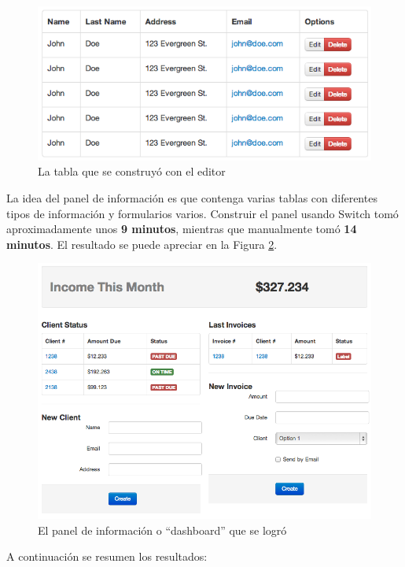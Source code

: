 \documentclass[12pt,titlepage,]{article}
\makeatletter
\def\maxwidth{\ifdim\Gin@nat@width>\linewidth\linewidth
\else\Gin@nat@width\fi}
\let\Oldincludegraphics\includegraphics
\renewcommand{\includegraphics}[1]{\Oldincludegraphics[width=\maxwidth]{#1}}
\makeatother
\begin{document}
\begin{figure}[htbp]
\centering
\includegraphics{figures/table-switch.png}
\caption{La tabla que se construyó con el editor
\label{figures:table-switch}}
\end{figure}

La idea del panel de información es que contenga varias tablas con
diferentes tipos de información y formularios varios. Construir el panel
usando Switch tomó aproximadamente unos \textbf{9 minutos}, mientras que
manualmente tomó \textbf{14 minutos}. El resultado se puede apreciar en
la Figura \ref{figures:dashboard}.

\begin{figure}[htbp]
\centering
\includegraphics{figures/dashboard.png}
\caption{El panel de información o ``dashboard'' que se logró
\label{figures:dashboard}}
\end{figure}

A continuación se resumen los resultados:
\end{document}
